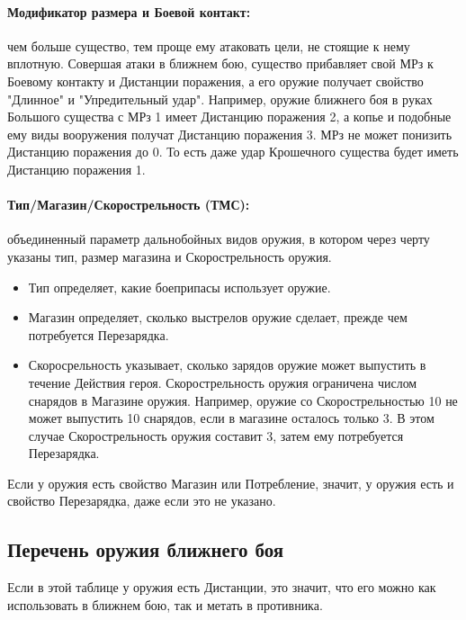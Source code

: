 \paragraph{Модификатор размера и Боевой контакт:} чем больше существо, тем проще ему атаковать цели, не стоящие к нему вплотную. Совершая атаки в ближнем бою, существо прибавляет свой МРз к Боевому контакту и Дистанции поражения, а его оружие получает свойство "Длинное" и "Упредительный удар". Например, оружие ближнего боя в руках Большого существа с МРз 1 имеет Дистанцию поражения 2, а копье и подобные ему виды вооружения получат Дистанцию поражения 3. МРз не может понизить Дистанцию поражения до 0. То есть даже удар Крошечного существа будет иметь Дистанцию поражения 1.

\paragraph{Тип/Магазин/Скорострельность (ТМС):} объединенный параметр дальнобойных видов оружия, в котором через черту указаны тип, размер магазина и Скорострельность оружия.
\begin{itemize}
    \item Тип определяет, какие боеприпасы использует оружие.
    \item Магазин определяет, сколько выстрелов оружие сделает, прежде чем потребуется Перезарядка.
    \item Скоросрельность указывает, сколько зарядов оружие может выпустить в течение Действия героя. Скорострельность оружия ограничена числом снарядов в Магазине оружия. Например, оружие со Скорострельностью 10 не может выпустить 10 снарядов, если в магазине осталось только 3. В этом случае Скорострельность оружия составит 3, затем ему потребуется Перезарядка.
\end{itemize}
\begin{tcolorbox}
    Если у оружия есть свойство Магазин или Потребление, значит, у оружия есть и свойство Перезарядка, даже если это не указано.
\end{tcolorbox}




\newpage
\subsection{Перечень оружия ближнего боя}
Если в этой таблице у оружия есть Дистанции, это значит, что его можно как использовать в ближнем бою, так и метать в противника.

